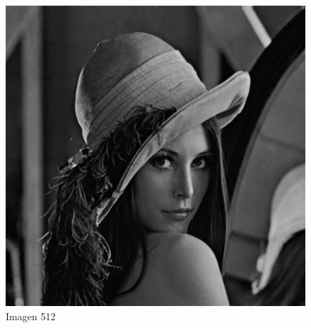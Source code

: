 \documentclass{article}
\begin{document}
\begin{multicols}{2}





\begin{figure}[H]
\centering
\includegraphics[scale=0.2]{../img/lena512.png}
\caption{Imagen 512}
\label{Imagen 512}
\end{figure}


\end{multicols}
\end{document}
